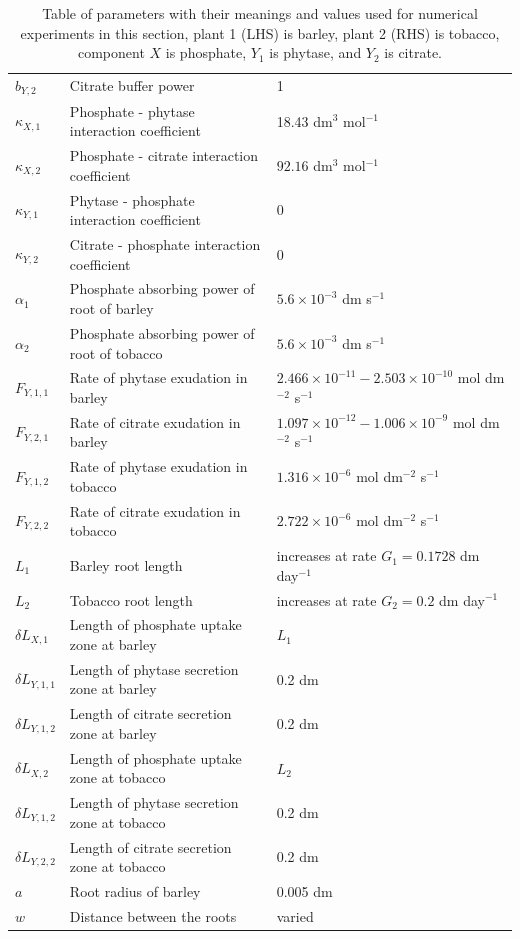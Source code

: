 \documentclass[11pt]{article}
\numberwithin{equation}{section}
\begin{document}
\begin{table}[!htb]
\begin{center}
\begin{tabular}{lll}
	$b_{Y,2}$ & Citrate buffer power & 1 \\
	$\kappa_{X,1}$ & Phosphate - phytase interaction coefficient & 18.43 dm$^3$ mol$^{-1}$ \\
	$\kappa_{X,2}$ & Phosphate - citrate interaction coefficient & $92.16$ dm$^3$ mol$^{-1}$ \\
	$\kappa_{Y,1}$ & Phytase - phosphate interaction coefficient & 0 \\
	$\kappa_{Y,2}$ & Citrate - phosphate interaction coefficient & 0 \\ 
	$\alpha_1 $ & Phosphate absorbing power of root of barley & $5.6 \times 10^{-3}$ dm s$^{-1}$\\
	$\alpha_2 $ & Phosphate absorbing power of root of tobacco & $5.6 \times 10^{-3}$ dm s$^{-1}$\\
	$F_{Y,1,1} $ & Rate of phytase exudation in barley & $2.466 \times 10^{-11} - 2.503 \times 10^{-10}$  mol dm$^{-2}$ s$^{-1}$ \\
	$F_{Y,2,1} $ & Rate of citrate exudation in barley & $1.097 \times 10^{-12} - 1.006 \times 10^{-9}$ mol dm$^{-2}$ s$^{-1}$ \\
	$F_{Y,1,2} $ & Rate of phytase exudation in tobacco &  $1.316 \times 10^{-6}$ mol dm$^{-2}$ s$^{-1}$ \\
	$F_{Y,2,2} $ & Rate of citrate exudation in tobacco &  $2.722 \times 10^{-6}$ mol dm$^{-2}$ s$^{-1}$ \\
	$L_1$ & Barley root length & increases at rate $G_1 = 0.1728$ dm day$^{-1}$ \\
	$L_2$ & Tobacco root length & increases at rate $G_2 = 0.2$ dm day$^{-1}$\\
	$\delta L_{X,1}$ & Length of phosphate uptake zone at barley & $L_1$\\
	$\delta L_{Y,1,1}$ & Length of phytase secretion zone at barley & 0.2 dm \\
	$\delta L_{Y,1,2}$ & Length of citrate secretion zone at barley & 0.2 dm\\
	$\delta L_{X,2}$ & Length of phosphate uptake zone at tobacco & $L_2$ \\
	$\delta L_{Y,1,2}$ &  Length of phytase secretion zone at tobacco & 0.2 dm \\
	$\delta L_{Y,2,2}$ &  Length of citrate secretion zone at tobacco & 0.2 dm \\
	$a$ & Root radius of barley & 0.005 dm \\
	$w$ & Distance between the roots & varied \\
\bottomrule

\end{tabular}
\caption{Table of parameters with their meanings and values used for numerical experiments in this section, plant 1 (LHS) is barley, plant 2 (RHS) is tobacco, component $X$ is phosphate, $Y_1$ is phytase, and $Y_2$ is citrate. \label{t:Second-model-params}
}
\end{center}

\end{table}
\end{document}
